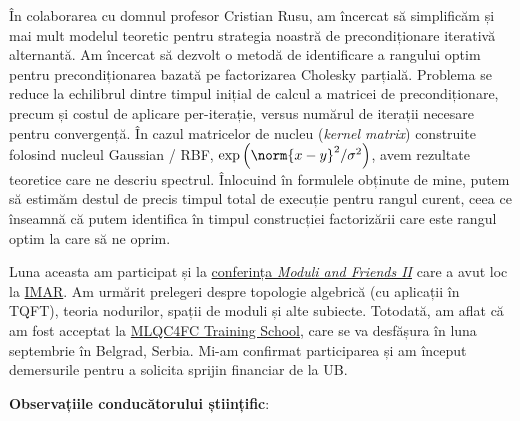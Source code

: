 În colaborarea cu domnul profesor Cristian Rusu, am încercat să simplificăm și mai mult modelul teoretic pentru strategia noastră de precondiționare iterativă alternantă. Am încercat să dezvolt o metodă de identificare a rangului optim pentru precondiționarea bazată pe factorizarea Cholesky parțială. Problema se reduce la echilibrul dintre timpul inițial de calcul a matricei de precondiționare, precum și costul de aplicare per-iterație, versus numărul de iterații necesare pentru convergență. În cazul matricelor de nucleu (\textit{kernel matrix}) construite folosind nucleul Gaussian / RBF, \(\exp\left(\norm{x - y}^2/\sigma^2\right)\), avem rezultate teoretice care ne descriu spectrul. Înlocuind în formulele obținute de mine, putem să estimăm destul de precis timpul total de execuție pentru rangul curent, ceea ce înseamnă că putem identifica în timpul construcției factorizării care este rangul optim la care să ne oprim.

Luna aceasta am participat și la \href{https://sites.google.com/view/moduliandfriends2}{conferința \emph{Moduli and Friends II}} care a avut loc la \href{https://imar.ro/}{IMAR}. Am urmărit prelegeri despre topologie algebrică (cu aplicații în TQFT), teoria nodurilor, spații de moduli și alte subiecte. Totodată, am aflat că am fost acceptat la \href{https://indico.cern.ch/event/1696287/}{MLQC4FC Training School}, care se va desfășura în luna septembrie în Belgrad, Serbia. Mi-am confirmat participarea și am început demersurile pentru a solicita sprijin financiar de la UB.

\textbf{Observațiile conducătorului științific}:

